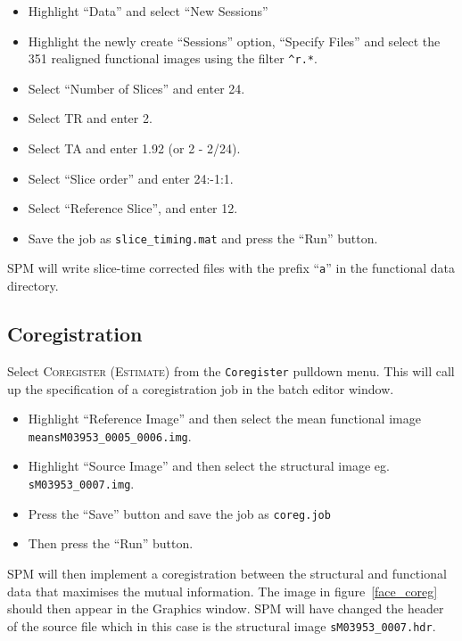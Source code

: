 \begin{itemize}
\item Highlight ``Data'' and select ``New Sessions''
\item Highlight the newly create ``Sessions'' option, ``Specify Files'' and select the 351 realigned functional images using the filter \texttt{\textasciicircum r.*}.
\item Select ``Number of Slices'' and enter 24.
\item Select TR and enter 2.
\item Select TA and enter 1.92 (or 2 - 2/24).
\item Select ``Slice order'' and enter 24:-1:1.
\item Select ``Reference Slice'', and enter 12.
\item Save the job as \texttt{slice\_timing.mat} and press the ``Run'' button.
\end{itemize}
SPM will write slice-time corrected files with the prefix ``\texttt{a}'' in the functional data directory.

\subsection{Coregistration}

Select \textsc{Coregister (Estimate)} from the \texttt{Coregister} pulldown menu. This will call up the specification of a coregistration job in the batch editor 
window. 

\begin{itemize}
\item Highlight ``Reference Image'' and then select the mean functional image \texttt{meansM03953\_0005\_0006.img}.
\item Highlight ``Source Image'' and then select the structural image eg. \texttt{sM03953\_0007.img}.
\item Press the ``Save'' button and save the job as \texttt{coreg.job}
\item Then press the ``Run'' button.
\end{itemize}

SPM will then implement a coregistration between the structural and functional data that maximises the mutual information. The image in figure~\ref{face_coreg} should then appear in the Graphics window. SPM will have changed the header of the source file which in this case is the structural image \texttt{sM03953\_0007.hdr}.

